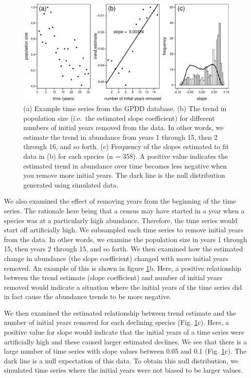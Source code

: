 \documentclass[]{article}
\begin{document}
\begin{figure}[htbp]
\centering
\includegraphics{Empirical_Investigation_files/figure-latex/unnamed-chunk-8-1.pdf}
\caption{(a) Example time series from the GPDD database. (b) The trend
in population size (i.e.~the estimated slope coefficient) for different
numbers of initial years removed from the data. In other words, we
estimate the trend in abundance from years 1 through 15, then 2 through
16, and so forth. (c) Frequency of the slopes estimated to fit data in
(b) for each species (n = 358). A positive value indicates the estimated
trend in abundance over time becomes less negative when you remove more
initial years. The dark line is the null distribution generated using
simulated data.\label{fig:removing_initial_years}}
\end{figure}

We also examined the effect of removing years from the beginning of the
time series. The rationale here being that a census may have started in
a year when a species was at a particularly high abundance. Therefore,
the time series would start off artificially high. We subsampled each
time series to remove initial years from the data. In other words, we
examine the population size in years 1 through 15, then years 2 through
15, and so forth. We then examined how the estimated change in abundance
(the slope coefficient) changed with more initial years removed. An
example of this is shown in figure \ref{fig:removing_initial_years}b.
Here, a positive relationship between the trend estimate (slope
coefficient) and number of initial years removed would indicate a
situation where the initial years of the time series did in fact cause
the abundance trends to be more negative.

We then examined the estimated relationship between trend estimate and
the number of initial years removed for each declining species (Fig.
\ref{fig:removing_initial_years}c). Here, a positive value for slope
would indicate that the initial years of a time series were artificially
high and these caused larger estimated declines. We see that there is a
large number of time series with slope values between 0.05 and 0.1 (Fig.
\ref{fig:removing_initial_years}c). The dark line is a null expectation
of this data. To obtain this null distribution, we simulated time series
where the initial years were not biased to be larger values.
\end{document}
